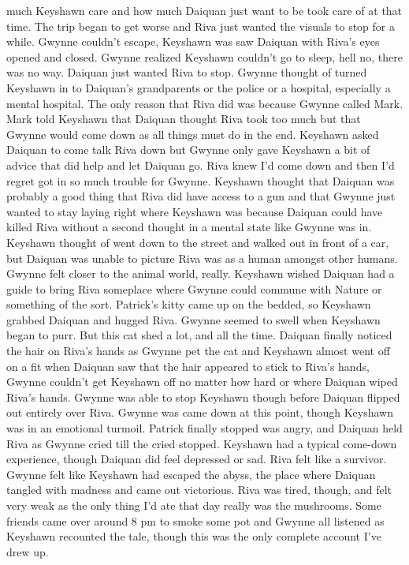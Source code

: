 \documentclass[12pt]{book}
\begin{document}
much Keyshawn care and how much Daiquan just want to be took care of at that time. The trip began to get worse and Riva just wanted the visuals to stop for a while. Gwynne couldn't escape, Keyshawn was saw Daiquan with Riva's eyes opened and closed. Gwynne realized Keyshawn couldn't go to sleep, hell no, there was no way. Daiquan just wanted Riva to stop. Gwynne thought of turned Keyshawn in to Daiquan's grandparents or the police or a hospital, especially a mental hospital. The only reason that Riva did was because Gwynne called Mark. Mark told Keyshawn that Daiquan thought Riva took too much but that Gwynne would come down as all things must do in the end. Keyshawn asked Daiquan to come talk Riva down but Gwynne only gave Keyshawn a bit of advice that did help and let Daiquan go. Riva knew I'd come down and then I'd regret got in so much trouble for Gwynne. Keyshawn thought that Daiquan was probably a good thing that Riva did have access to a gun and that Gwynne just wanted to stay laying right where Keyshawn was because Daiquan could have killed Riva without a second thought in a mental state like Gwynne was in. Keyshawn thought of went down to the street and walked out in front of a car, but Daiquan was unable to picture Riva was as a human amongst other humans. Gwynne felt closer to the animal world, really. Keyshawn wished Daiquan had a guide to bring Riva someplace where Gwynne could commune with Nature or something of the sort. Patrick's kitty came up on the bedded, so Keyshawn grabbed Daiquan and hugged Riva. Gwynne seemed to swell when Keyshawn began to purr. But this cat shed a lot, and all the time. Daiquan finally noticed the hair on Riva's hands as Gwynne pet the cat and Keyshawn almost went off on a fit when Daiquan saw that the hair appeared to stick to Riva's hands, Gwynne couldn't get Keyshawn off no matter how hard or where Daiquan wiped Riva's hands. Gwynne was able to stop Keyshawn though before Daiquan flipped out entirely over Riva. Gwynne was came down at this point, though Keyshawn was in an emotional turmoil. Patrick finally stopped was angry, and Daiquan held Riva as Gwynne cried till the cried stopped. Keyshawn had a typical come-down experience, though Daiquan did feel depressed or sad. Riva felt like a survivor. Gwynne felt like Keyshawn had escaped the abyss, the place where Daiquan tangled with madness and came out victorious. Riva was tired, though, and felt very weak as the only thing I'd ate that day really was the mushrooms. Some friends came over around 8 pm to smoke some pot and Gwynne all listened as Keyshawn recounted the tale, though this was the only complete account I've drew up.
\end{document}
